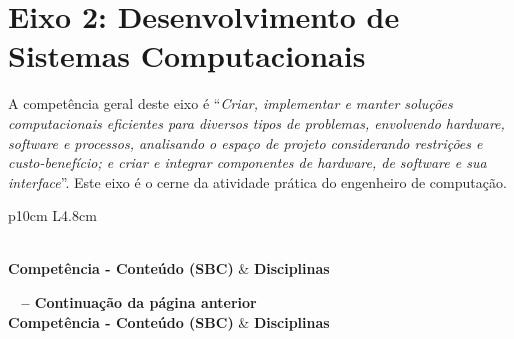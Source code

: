 \section{Eixo 2: Desenvolvimento de Sistemas Computacionais}
A competência geral deste eixo é ``\textit{Criar, implementar e manter soluções computacionais eficientes para diversos tipos de problemas, envolvendo hardware, software e processos, analisando o espaço de projeto considerando restrições e custo-benefício; e criar e integrar componentes de hardware, de software e sua interface}''. Este eixo é o cerne da atividade prática do engenheiro de computação.

\begin{small}
    \begin{longtable}{p{10cm} L{4.8cm}}
        \caption{Relação entre as competências do Eixo 2 da SBC e as disciplinas do curso} \label{eixo1}    \\
        \toprule
        \textbf{Competência - Conteúdo (SBC)}           & \textbf{Disciplinas}                              \\
        \midrule
        \endfirsthead

        {{\bfseries \tablename\ \thetable{} -- Continuação da página anterior}}                             \\
        \toprule
        \textbf{Competência - Conteúdo (SBC)}           & \textbf{Disciplinas}                              \\
        \midrule
        \endhead

        \midrule {}                                           \\
        \endfoot

        \bottomrule
        \endlastfoot


\end{longtable}
\end{small}
